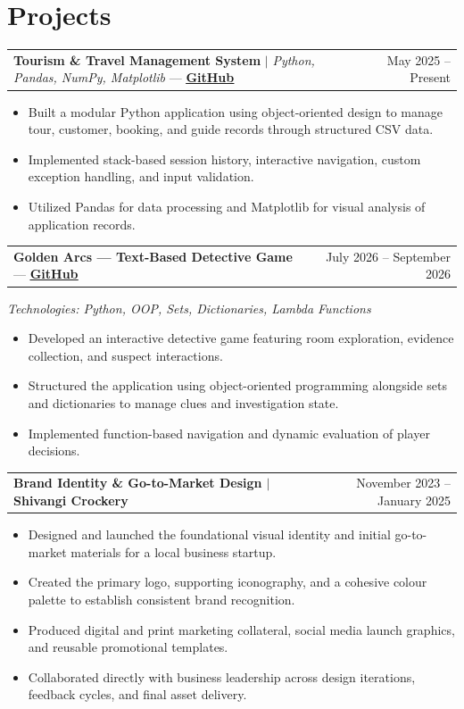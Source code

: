 \documentclass[10pt,a4paper]{article}
\makeatletter
\newcommand{\resumeProjectHeading}[2]{
  \vspace{0.5pt}
  \begin{tabular*}{\textwidth}{l@{\extracolsep{\fill}}r}
    \small #1 & \color{navy}\small #2 \\
  \end{tabular*}\vspace{-6pt}
}
\newcommand{\resumeItem}[1]{
  \item\small{#1 \vspace{-2pt}}
}
\makeatother
\begin{document}
\section{Projects}
\resumeProjectHeading
  {\textbf{Tourism \& Travel Management System} $|$ \emph{Python, Pandas, NumPy, Matplotlib} --- \href{https://github.com/shivangichaudhary-cse/Tourism-and-travel-management-system}{\textbf{\underline{GitHub}}}}{May 2025 -- Present}
\begin{itemize}[leftmargin=0.16in, itemsep=1pt, topsep=2pt, parsep=0pt, label=\textbullet]
  \resumeItem{Built a modular Python application using object-oriented design to manage tour, customer, booking, and guide records through structured CSV data.}
  \resumeItem{Implemented stack-based session history, interactive navigation, custom exception handling, and input validation.}
  \resumeItem{Utilized Pandas for data processing and Matplotlib for visual analysis of application records.}
\end{itemize}

\resumeProjectHeading
  {\textbf{Golden Arcs --- Text-Based Detective Game} --- \href{https://github.com/shivangichaudhary-cse/Golden-Arcs}{\textbf{\underline{GitHub}}}}{July 2026 -- September 2026}
\vspace{1pt}
{\small\emph{\color{slate}Technologies: Python, OOP, Sets, Dictionaries, Lambda Functions}}
\begin{itemize}[leftmargin=0.16in, itemsep=1pt, topsep=2pt, parsep=0pt, label=\textbullet]
  \resumeItem{Developed an interactive detective game featuring room exploration, evidence collection, and suspect interactions.}
  \resumeItem{Structured the application using object-oriented programming alongside sets and dictionaries to manage clues and investigation state.}
  \resumeItem{Implemented function-based navigation and dynamic evaluation of player decisions.}
\end{itemize}

\resumeProjectHeading
  {\textbf{Brand Identity \& Go-to-Market Design $|$ Shivangi Crockery}}{November 2023 -- January 2025}
\begin{itemize}[leftmargin=0.16in, itemsep=1pt, topsep=2pt, parsep=0pt, label=\textbullet]
  \resumeItem{Designed and launched the foundational visual identity and initial go-to-market materials for a local business startup.}
  \resumeItem{Created the primary logo, supporting iconography, and a cohesive colour palette to establish consistent brand recognition.}
  \resumeItem{Produced digital and print marketing collateral, social media launch graphics, and reusable promotional templates.}
  \resumeItem{Collaborated directly with business leadership across design iterations, feedback cycles, and final asset delivery.}
\end{itemize}
\end{document}
